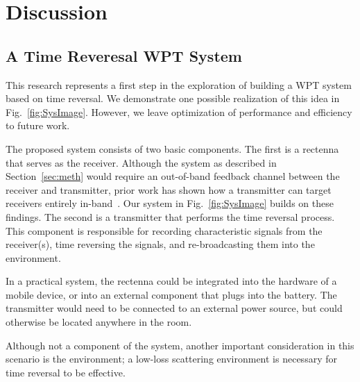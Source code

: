 \section{Discussion}
\label{sec:discussion}

\subsection{A Time Reveresal WPT System}
\label{sec:system}

This research represents a first step in the exploration of building a
WPT system based on time reversal.
%
We demonstrate one possible realization of this idea in Fig.~\ref{fig:SysImage}.
%
However, we leave optimization of performance and efficiency to future work.


The proposed system consists of two basic components.
%
The first is a rectenna that serves as the receiver.
%
Although the system as described in Section~\ref{sec:meth} would require an
out-of-band feedback channel between the receiver and transmitter, prior work
has shown how a transmitter can target receivers entirely
in-band~\cite{nltr-wave-chaotic,roman}.
%
Our system in Fig.~\ref{fig:SysImage} builds on these findings.
%
The second is a transmitter that performs the time reversal process.
%
This component is responsible for recording characteristic signals from the
receiver(s), time reversing the signals, and re-broadcasting them into the
environment.



In a practical system, the rectenna could be integrated into the hardware of a
mobile device, or into an external component that plugs into the battery.
%
The transmitter would need to be connected to an external power source, but
could otherwise be located anywhere in the room.


Although not a component of the system, another important consideration in this
scenario is the environment; a low-loss scattering environment is necessary for
time reversal to be effective.

